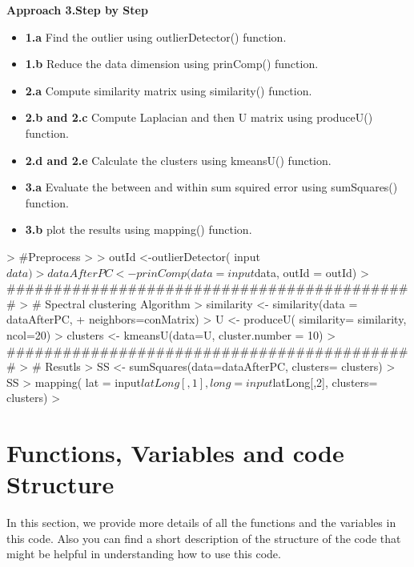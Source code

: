 \documentclass{article}
\begin{document}
{\bf Approach 3.Step by Step} \\
\begin{itemize}
\item {\bf 1.a } Find the outlier using outlierDetector() function.\\
\item {\bf 1.b} Reduce the data dimension using prinComp() function.\\
\item {\bf 2.a } Compute similarity matrix using similarity() function.\\
\item {\bf 2.b and 2.c} Compute Laplacian and then U matrix using produceU() function.\\
\item {\bf 2.d and 2.e} Calculate the clusters using kmeansU() function.\\
\item {\bf 3.a} Evaluate the between and within sum squired error using sumSquares() function.\\
\item {\bf 3.b} plot the results using mapping() function.\\
\end{itemize}
\begin{Schunk}
\begin{Sinput}
> #Preprocess
> 
> outId <-outlierDetector( input$data )
> dataAfterPC <- prinComp(data = input$data, outId = outId)
> ############################################
> # Spectral clustering Algorithm
> similarity <- similarity(data = dataAfterPC, 
+                          neighbors=conMatrix)
> U <- produceU( similarity= similarity, ncol=20)
> clusters <- kmeansU(data=U, cluster.number = 10)
> ############################################
> # Resutls
> SS <- sumSquares(data=dataAfterPC, clusters= clusters)
> SS
> mapping( lat = input$latLong[,1],long=input$latLong[,2], clusters= clusters)
> 
\end{Sinput}
\end{Schunk}
\newpage
\section {Functions, Variables and code Structure}
In this section, we provide more details of all the functions and  the variables in this code. Also you can find a short description of the structure of the code  that might be helpful in understanding how to use this code.
\end{document}
